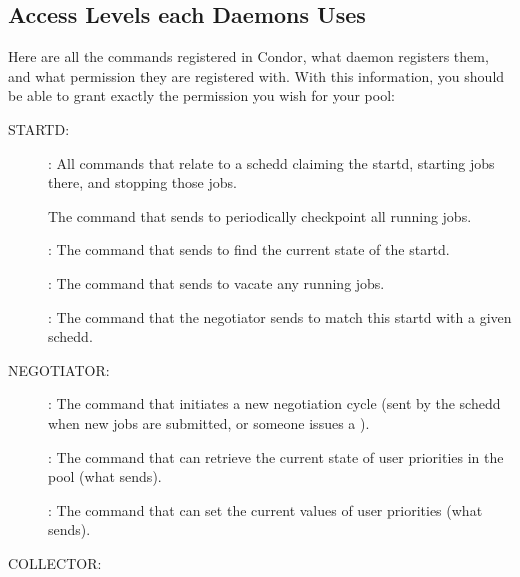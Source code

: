 \subsection{\label{sec:DCPerm-per-Daemon}Access Levels each Daemons
Uses} 

Here are all the commands registered in Condor, what daemon registers
them, and what permission they are registered with.  With this
information, you should be able to grant exactly the permission you
wish for your pool:


STARTD:

\begin{description}
\item[] : All commands that relate to a schedd claiming
  the startd, starting jobs there, and stopping those jobs.

  The command that  sends to periodically checkpoint
  all running jobs.

\item[] : The command that  sends to find the
  current state of the startd.

\item[] : The command that  sends to vacate
  any running jobs.

\item[] : The command that the negotiator sends to
  match this startd with a given schedd.
\end{description}

NEGOTIATOR:

\begin{description}
\item[] : The command that initiates a new negotiation
  cycle (sent by the schedd when new jobs are submitted, or someone
  issues a ).

\item[] : The command that can retrieve the current state
  of user priorities in the pool (what  sends).

\item[] : The command that can set the current
  values of user priorities (what  sends).
\end{description}

COLLECTOR:

